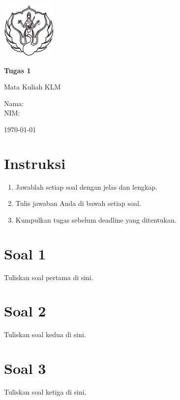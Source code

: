 \documentclass[a4paper,12pt]{article}
\renewcommand{\maketitle}{
  \begin{titlepage}
    \centering
    \includegraphics[width=0.2\textwidth]{../images/logo.png}\par\vspace{1cm}
    {\Huge\bfseries Tugas 1}\par\vspace{0.5em}
    {\Large Mata Kuliah KLM}\par\vspace{2cm}
    {\large Nama: \AuthorName\\NIM: \AuthorNIM}\par\vspace{1cm}
    {\large \today}\par
  \end{titlepage}
}
\begin{document}
\maketitle

\section*{Instruksi}
\begin{enumerate}[label=\arabic*.]
    \item Jawablah setiap soal dengan jelas dan lengkap.
    \item Tulis jawaban Anda di bawah setiap soal.
    \item Kumpulkan tugas sebelum deadline yang ditentukan.
\end{enumerate}

\section*{Soal 1}
Tuliskan soal pertama di sini.

\vspace{3cm}

\section*{Soal 2}
Tuliskan soal kedua di sini.

\vspace{3cm}

\section*{Soal 3}
Tuliskan soal ketiga di sini.

\vspace{3cm}
\end{document}

